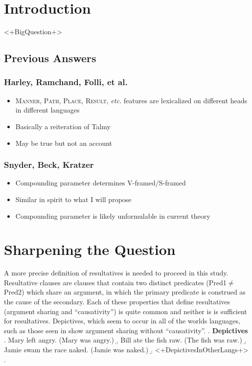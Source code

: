 \documentclass[letterpaper,12pt]{article}
\begin{document}
\section{Introduction}

<+BigQuestion+>

\subsection{Previous Answers}
\subsubsection{Harley, Ramchand, Folli, et al.}
\begin{itemize}
  \item \textsc{Manner, Path, Place, Result}, \textit{etc.} features are lexicalized on different heads in different languages
  \item Basically a reiteration of Talmy
  \item May be true but not an account
\end{itemize}
\subsubsection{Snyder, Beck, Kratzer}
\begin{itemize}
  \item Compounding parameter determines V-framed/S-framed
  \item Similar in spirit to what I will propose
  \item Compounding parameter is likely unformulable in current theory
\end{itemize}

\section{Sharpening the Question}
A more precise definition of resultatives is needed to proceed in this study.
Resultative clauses are clauses that contain two distinct predicates (Pred1$\neq$Pred2) which share an argument, in which the primary predicate is construed as the cause of the secondary.
Each of these properties that define resultatives (argument sharing and ``causativity'') is quite common and neither is is sufficient for resultatives.
Depictives, which seem to occur in all of the worlds languages, such as those seen in \Next show argument sharing without ``causativity''.
\ex. \textbf{Depictives}
\a. Mary left angry. (Mary was angry.)
\b. Bill ate the fish raw. (The fish was raw.)
\b. Jamie swam the race naked. (Jamie was naked.)
\b. <+DepictivesInOtherLangs+>
\z.
\end{document}

